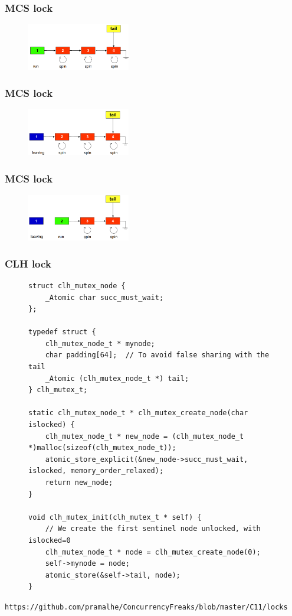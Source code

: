 \documentclass[aspectratio=169, pdf, 8pt, unicode]{beamer}
\begin{document}
\begin{frame}
\frametitle{MCS lock}
\begin{figure}[H]
\centering
\includegraphics[width=0.4\textwidth]{fig/mcs4.png}
\end{figure}
\end{frame}

\begin{frame}
\frametitle{MCS lock}
\begin{figure}[H]
\centering
\includegraphics[width=0.4\textwidth]{fig/mcs5.png}
\end{figure}
\end{frame}

\begin{frame}
\frametitle{MCS lock}
\begin{figure}[H]
\centering
\includegraphics[width=0.4\textwidth]{fig/mcs6.png}
\end{figure}
\end{frame}

\begin{frame}[fragile]
\frametitle{CLH lock}
\begin{figure}[H]
\begin{minipage}{0.8\textwidth}
\small
\begin{verbatim}
struct clh_mutex_node {
    _Atomic char succ_must_wait;
};

typedef struct {
    clh_mutex_node_t * mynode;
    char padding[64];  // To avoid false sharing with the tail
    _Atomic (clh_mutex_node_t *) tail;
} clh_mutex_t;

static clh_mutex_node_t * clh_mutex_create_node(char islocked) {
    clh_mutex_node_t * new_node = (clh_mutex_node_t *)malloc(sizeof(clh_mutex_node_t));
    atomic_store_explicit(&new_node->succ_must_wait, islocked, memory_order_relaxed);
    return new_node;
}

void clh_mutex_init(clh_mutex_t * self) {
    // We create the first sentinel node unlocked, with islocked=0
    clh_mutex_node_t * node = clh_mutex_create_node(0);
    self->mynode = node;
    atomic_store(&self->tail, node);
}
\end{verbatim}
\end{minipage}
\end{figure}
\texttt{https://github.com/pramalhe/ConcurrencyFreaks/blob/master/C11/locks}
\end{frame}
\end{document}
